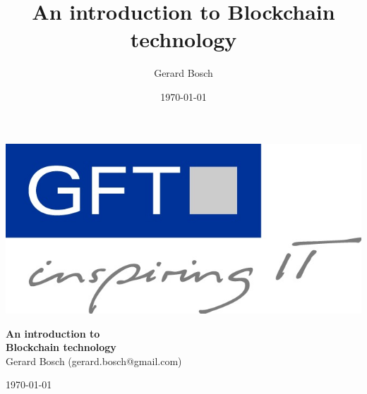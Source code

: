 \documentclass[notitlepage, usenames,dvipsnames]{beamer}
\title[Introduction to Blockchain Technology]{An introduction to Blockchain technology}
\author[Gerard Bosch]{Gerard Bosch}
\institute{\email{gerard.bosch@gmail.com}}
\date{\today}
\begin{document}
\begin{frame}
\begin{center}
\vspace{-4mm}\begin{center}\includegraphics[scale=0.15]{../img/gft.jpg}\end{center}

\vspace{1cm}
{\huge \bfseries \textcolor{MidnightBlue!100!bg}{ An introduction to\\[3mm] Blockchain technology }} \\[3mm]

\vspace{1 cm}
Gerard Bosch (gerard.bosch@gmail.com)

\vspace{0.8cm}\today
\end{center}
\end{frame}



{}
\end{document}
